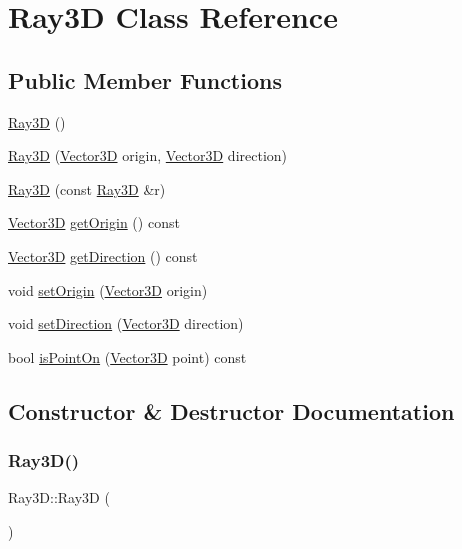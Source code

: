 \hypertarget{classRay3D}{}\section{Ray3D Class Reference}
\label{classRay3D}
\subsection*{Public Member Functions}
\begin{DoxyCompactItemize}
\item 
\hyperlink{classRay3D_a13768cb6020d680745d9c3744e1464d6}{Ray3D} ()
\item 
\hyperlink{classRay3D_ab1ac8135f87e4987d9600cb9ba88a4e4}{Ray3D} (\hyperlink{classVector3D}{Vector3D} origin, \hyperlink{classVector3D}{Vector3D} direction)
\item 
\hyperlink{classRay3D_af5e8f0f9eaa1a99ab8d2d4241aa8580f}{Ray3D} (const \hyperlink{classRay3D}{Ray3D} \&r)
\item 
\hyperlink{classVector3D}{Vector3D} \hyperlink{classRay3D_a502f164e4686e935b2da62ecfc3c1763}{get\+Origin} () const
\item 
\hyperlink{classVector3D}{Vector3D} \hyperlink{classRay3D_a62d8fd3e9685b09cc9eef7d553bdffb0}{get\+Direction} () const
\item 
void \hyperlink{classRay3D_af55f9d1ca3d2b9f1eba5d7e6cf03b660}{set\+Origin} (\hyperlink{classVector3D}{Vector3D} origin)
\item 
void \hyperlink{classRay3D_a3cb1d7b99c881a9fc059ef125232bb3b}{set\+Direction} (\hyperlink{classVector3D}{Vector3D} direction)
\item 
bool \hyperlink{classRay3D_a3d2192f11ca0607eab71e66551cc9288}{is\+Point\+On} (\hyperlink{classVector3D}{Vector3D} point) const
\end{DoxyCompactItemize}


\subsection{Constructor \& Destructor Documentation}
\mbox{\label{classRay3D_a13768cb6020d680745d9c3744e1464d6}} 
\subsubsection{\texorpdfstring{Ray3\+D()}{Ray3D()}\hspace{0.1cm}{\footnotesize\ttfamily [1/3]}}
{\footnotesize\ttfamily Ray3\+D\+::\+Ray3D (\begin{DoxyParamCaption}{ }\end{DoxyParamCaption})}

